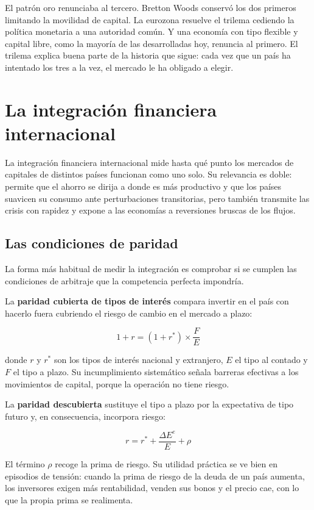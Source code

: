 El patrón oro renunciaba al tercero. Bretton Woods conservó los dos primeros
limitando la movilidad de capital. La eurozona resuelve el trilema cediendo la
política monetaria a una autoridad común. Y una economía con tipo flexible y
capital libre, como la mayoría de las desarrolladas hoy, renuncia al primero. El
trilema explica buena parte de la historia que sigue: cada vez que un país ha
intentado los tres a la vez, el mercado le ha obligado a elegir.

\section{La integración financiera internacional}

La integración financiera internacional mide hasta qué punto los mercados de
capitales de distintos países funcionan como uno solo. Su relevancia es doble:
permite que el ahorro se dirija a donde es más productivo y que los países
suavicen su consumo ante perturbaciones transitorias, pero también transmite las
crisis con rapidez y expone a las economías a reversiones bruscas de los flujos.

\subsection{Las condiciones de paridad}

La forma más habitual de medir la integración es comprobar si se cumplen las
condiciones de arbitraje que la competencia perfecta impondría.

La \textbf{paridad cubierta de tipos de interés} compara invertir en el país con
hacerlo fuera cubriendo el riesgo de cambio en el mercado a plazo:

\[
1 + r = (1 + r^{*}) \times \frac{F}{E}
\]

donde $r$ y $r^{*}$ son los tipos de interés nacional y extranjero, $E$ el tipo
al contado y $F$ el tipo a plazo. Su incumplimiento sistemático señala barreras
efectivas a los movimientos de capital, porque la operación no tiene riesgo.

La \textbf{paridad descubierta} sustituye el tipo a plazo por la expectativa de
tipo futuro y, en consecuencia, incorpora riesgo:

\[
r = r^{*} + \frac{\Delta E^{e}}{E} + \rho
\]

El término $\rho$ recoge la prima de riesgo. Su utilidad práctica se ve bien en
episodios de tensión: cuando la prima de riesgo de la deuda de un país aumenta,
los inversores exigen más rentabilidad, venden sus bonos y el precio cae, con lo
que la propia prima se realimenta.

